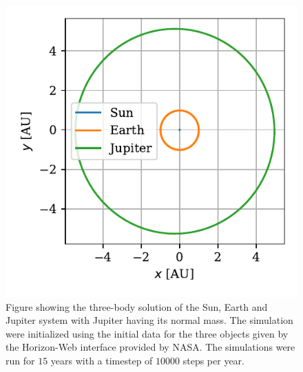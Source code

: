 \documentclass[twocolumn]{aastex62}
\begin{document}
\begin{figure}
\includegraphics[scale=1]{Figures/jupiter.pdf}
\caption{Figure showing the three-body solution of the Sun, Earth and Jupiter system
with Jupiter having its normal mass. The simulation were initialized using the
initial data for the three objects given by the Horizon-Web interface provided by NASA. The simulations
were run for $15$ years with a timestep of $10000$ steps per year.}
\label{fig:jupiter}
\end{figure}
\end{document}
